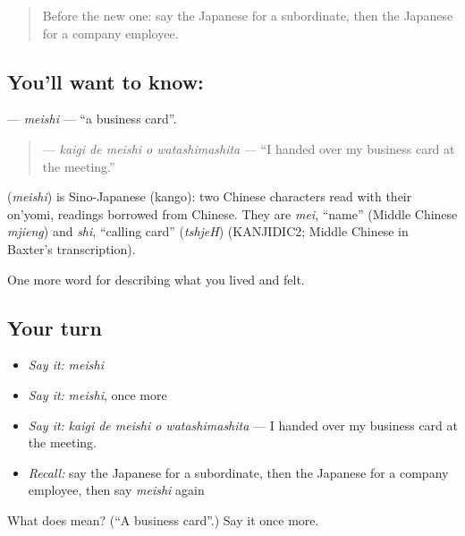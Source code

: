 \label{lesson:JA-C452-meishi}



\begin{quote}
Before the new one: say the Japanese for a subordinate, then the Japanese for a company employee.
\end{quote}

\subsection*{You'll want to know: }
\textbf{} — \emph{meishi} — \textquotedblleft{}a business card\textquotedblright{}.

\begin{quote}
\textbf{  } — \emph{kaigi de meishi o watashimashita} — \textquotedblleft{}I handed over my business card at the meeting.\textquotedblright{}
\end{quote}

\begin{cousinweb}
\textbf{} (\emph{meishi}) is Sino-Japanese (kango): two Chinese characters read with their on'yomi, readings borrowed from Chinese. They are \emph{mei}, \textquotedblleft{}name\textquotedblright{} (Middle Chinese \emph{mjieng}) and \emph{shi}, \textquotedblleft{}calling card\textquotedblright{} (\emph{tshjeH}) (KANJIDIC2; Middle Chinese in Baxter's transcription).
\end{cousinweb}

\begin{grammarlens}[title={What you've built}]
One more word for describing what you lived and felt.
\end{grammarlens}

\subsection*{Your turn}
\begin{itemize}
\raggedright
  \item \emph{Say it:} \emph{meishi}
  \item \emph{Say it:} \emph{meishi}, once more
  \item \emph{Say it:} \emph{kaigi de meishi o watashimashita} — I handed over my business card at the meeting.
  \item \emph{Recall:} say the Japanese for a subordinate, then the Japanese for a company employee, then say \emph{meishi} again
\end{itemize}

\begin{tcolorbox}[breakable,colback=teal!4,colframe=teal!35!black,title={Before you move on}]
What does  mean? (\textquotedblleft{}A business card\textquotedblright{}.) Say it once more.
\end{tcolorbox}
